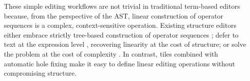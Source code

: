 These simple editing workflows are not trivial
in traditional term-based editors because,
from the perspective of the AST, linear construction of
operator sequences is a complex, context-sensitive operation.
Existing structure editors either embrace strictly tree-based
construction of operator sequences \cite{scratch};
defer to text at the expression level \cite{Cornell,greenfoot},
recovering linearity at the cost of structure;
or solve the problem at the cost of complexity
\cite{GrammarCells}.
In contrast, tiles combined with automatic hole fixing
make it easy to define linear editing operations
without compromising structure.









